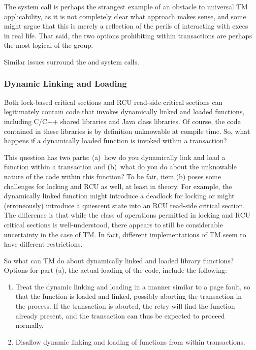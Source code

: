 The  system call is perhaps the strangest example of an
obstacle to universal TM applicability, as it is not completely clear
what approach makes sense, and some might argue that this is merely a
reflection of the perils of interacting with execs in real life.
That said, the two options prohibiting  within transactions
are perhaps the most logical of the group.

Similar issues surround the  and  system calls.

\subsubsection{Dynamic Linking and Loading}
\label{sec:future:Dynamic Linking and Loading}

Both lock-based critical sections and RCU read-side critical sections
can legitimately contain code that invokes dynamically linked and loaded
functions, including C/C++ shared libraries and Java class libraries.
Of course, the code contained in these libraries is by definition
unknowable at compile time.
So, what happens if a dynamically loaded function is invoked within
a transaction?

This question has two parts: (a)~how do you dynamically link and load a
function within a transaction and (b)~what do you do about the unknowable
nature of the code within this function?
To be fair, item (b) poses some challenges for locking and RCU as well,
at least in theory.
For example, the dynamically linked function might introduce a deadlock
for locking or might (erroneously) introduce a quiescent state into an
RCU read-side critical section.
The difference is that while the class of operations permitted in locking
and RCU critical sections is well-understood, there appears to still be
considerable uncertainty in the case of TM.
In fact, different implementations of TM seem to have different restrictions.

So what can TM do about dynamically linked and loaded library functions?
Options for part (a), the actual loading of the code, include the following:

\begin{enumerate}
\item	Treat the dynamic linking and loading in a manner similar to a
	page fault, so that the function is loaded and linked, possibly
	aborting the transaction in the process.
	If the transaction is aborted, the retry will find the function
	already present, and the transaction can thus be expected to
	proceed normally.
\item	Disallow dynamic linking and loading of functions from within
	transactions.
\end{enumerate}

